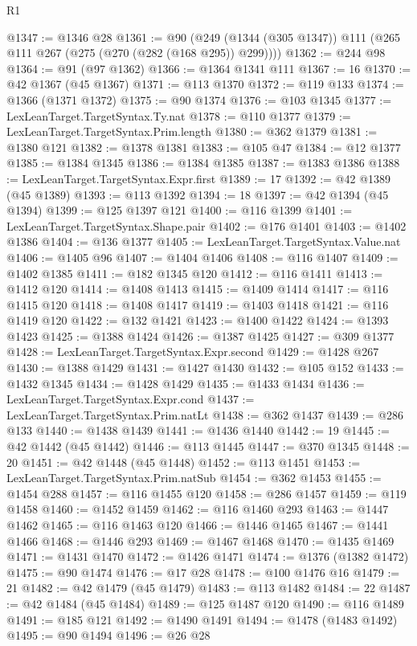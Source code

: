 \begin{lexlean}{R1}
\begin{coremodule}
@1347 := @1346 @28
@1361 := @90 (@249 (@1344 (@305 @1347)) @111 (@265 @111 @267 (@275 (@270 (@282 (@168 @295)) @299))))
@1362 := @244 @98
@1364 := @91 (@97 @1362)
@1366 := @1364 @1341 @111
@1367 := 16
@1370 := @42 @1367 (@45 @1367)
@1371 := @113 @1370
@1372 := @119 @133
@1374 := @1366 (@1371 @1372)
@1375 := @90 @1374
@1376 := @103 @1345
@1377 := LexLeanTarget.TargetSyntax.Ty.nat
@1378 := @110 @1377
@1379 := LexLeanTarget.TargetSyntax.Prim.length
@1380 := @362 @1379
@1381 := @1380 @121
@1382 := @1378 @1381
@1383 := @105 @47
@1384 := @12 @1377
@1385 := @1384 @1345
@1386 := @1384 @1385
@1387 := @1383 @1386
@1388 := LexLeanTarget.TargetSyntax.Expr.first
@1389 := 17
@1392 := @42 @1389 (@45 @1389)
@1393 := @113 @1392
@1394 := 18
@1397 := @42 @1394 (@45 @1394)
@1399 := @125 @1397 @121
@1400 := @116 @1399
@1401 := LexLeanTarget.TargetSyntax.Shape.pair
@1402 := @176 @1401
@1403 := @1402 @1386
@1404 := @136 @1377
@1405 := LexLeanTarget.TargetSyntax.Value.nat
@1406 := @1405 @96
@1407 := @1404 @1406
@1408 := @116 @1407
@1409 := @1402 @1385
@1411 := @182 @1345 @120
@1412 := @116 @1411
@1413 := @1412 @120
@1414 := @1408 @1413
@1415 := @1409 @1414
@1417 := @116 @1415 @120
@1418 := @1408 @1417
@1419 := @1403 @1418
@1421 := @116 @1419 @120
@1422 := @132 @1421
@1423 := @1400 @1422
@1424 := @1393 @1423
@1425 := @1388 @1424
@1426 := @1387 @1425
@1427 := @309 @1377
@1428 := LexLeanTarget.TargetSyntax.Expr.second
@1429 := @1428 @267
@1430 := @1388 @1429
@1431 := @1427 @1430
@1432 := @105 @152
@1433 := @1432 @1345
@1434 := @1428 @1429
@1435 := @1433 @1434
@1436 := LexLeanTarget.TargetSyntax.Expr.cond
@1437 := LexLeanTarget.TargetSyntax.Prim.natLt
@1438 := @362 @1437
@1439 := @286 @133
@1440 := @1438 @1439
@1441 := @1436 @1440
@1442 := 19
@1445 := @42 @1442 (@45 @1442)
@1446 := @113 @1445
@1447 := @370 @1345
@1448 := 20
@1451 := @42 @1448 (@45 @1448)
@1452 := @113 @1451
@1453 := LexLeanTarget.TargetSyntax.Prim.natSub
@1454 := @362 @1453
@1455 := @1454 @288
@1457 := @116 @1455 @120
@1458 := @286 @1457
@1459 := @119 @1458
@1460 := @1452 @1459
@1462 := @116 @1460 @293
@1463 := @1447 @1462
@1465 := @116 @1463 @120
@1466 := @1446 @1465
@1467 := @1441 @1466
@1468 := @1446 @293
@1469 := @1467 @1468
@1470 := @1435 @1469
@1471 := @1431 @1470
@1472 := @1426 @1471
@1474 := @1376 (@1382 @1472)
@1475 := @90 @1474
@1476 := @17 @28
@1478 := @100 @1476 @16
@1479 := 21
@1482 := @42 @1479 (@45 @1479)
@1483 := @113 @1482
@1484 := 22
@1487 := @42 @1484 (@45 @1484)
@1489 := @125 @1487 @120
@1490 := @116 @1489
@1491 := @185 @121
@1492 := @1490 @1491
@1494 := @1478 (@1483 @1492)
@1495 := @90 @1494
@1496 := @26 @28

\end{coremodule}
\end{lexlean}
